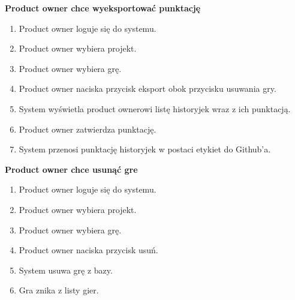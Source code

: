 \textbf{Product owner chce wyeksportować punktację}
\begin{enumerate}
    \item Product owner loguje się do systemu.
    \item Product owner wybiera projekt.
    \item Product owner wybiera grę.
    \item Product owner naciska przycisk eksport obok przycisku usuwania gry.
    \item System wyświetla product ownerowi listę historyjek wraz z ich punktacją.
    \item Product owner zatwierdza punktację.
    \item System przenosi punktację historyjek w postaci etykiet do Github'a.
\end{enumerate}
\textbf{Product owner chce usunąć gre}
\begin{enumerate}
    \item Product owner loguje się do systemu.
    \item Product owner wybiera projekt.
    \item Product owner wybiera grę.
    \item Product owner naciska przycisk usuń.
    \item System usuwa grę z bazy.
    \item Gra znika z listy gier.
\end{enumerate}
